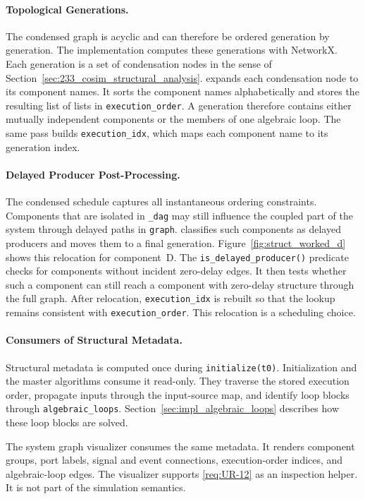 \paragraph{Topological Generations.}
The condensed graph is acyclic and can therefore be ordered generation by generation.
The implementation computes these generations with NetworkX.
Each generation is a set of condensation nodes in the sense of Section~\ref{sec:233_cosim_structural_analysis}.
\syssimx{} expands each condensation node to its component names.
It sorts the component names alphabetically and stores the resulting list of lists in \texttt{execution\_order}.
A generation therefore contains either mutually independent components or the members of one algebraic loop.
The same pass builds \texttt{execution\_idx}, which maps each component name to its generation index.

\paragraph{Delayed Producer Post-Processing.}
The condensed schedule captures all instantaneous ordering constraints.
Components that are isolated in \texttt{\_dag} may still influence the coupled part of the system through delayed paths in \texttt{graph}.
\syssimx{} classifies such components as delayed producers and moves them to a final generation.
Figure~\ref{fig:struct_worked_d} shows this relocation for component~D.
The \texttt{is\_delayed\_producer()} predicate checks for components without incident zero-delay edges.
It then tests whether such a component can still reach a component with zero-delay structure through the full graph.
After relocation, \texttt{execution\_idx} is rebuilt so that the lookup remains consistent with \texttt{execution\_order}.
This relocation is a \syssimx{} scheduling choice.

\paragraph{Consumers of Structural Metadata.}
Structural metadata is computed once during \texttt{initialize(t0)}.
Initialization and the master algorithms consume it read-only.
They traverse the stored execution order, propagate inputs through the input-source map, and identify loop blocks through \texttt{algebraic\_loops}.
Section~\ref{sec:impl_algebraic_loops} describes how these loop blocks are solved.

The system graph visualizer consumes the same metadata.
It renders component groups, port labels, signal and event connections, execution-order indices, and algebraic-loop edges.
The visualizer supports \ref{req:UR-12} as an inspection helper.
It is not part of the simulation semantics.


